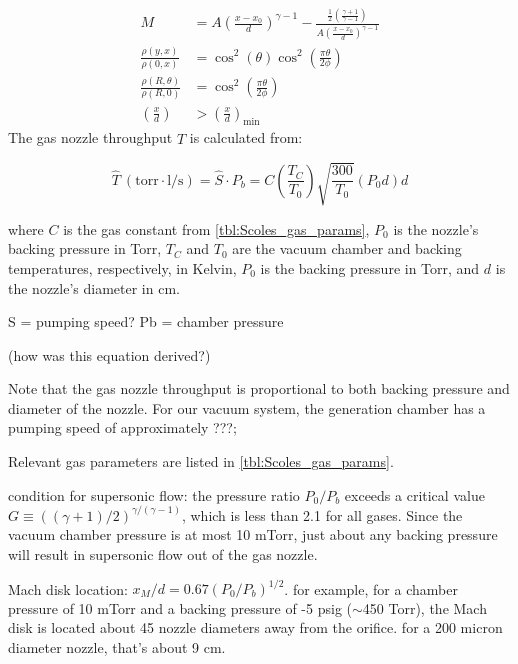 \begin{subequations}
	\label{eqn:Scoles_centerline2.1}
	\begin{align}
	M &= A \left( \frac{x-x_0}{d}\right)^{\gamma-1} - \frac{\frac{1}{2} \left( \frac{\gamma+1}{\gamma-1} \right)}{A \left(\frac{x-x_0}{d} \right)^{\gamma-1}} \label{eqn:gas_mach} \\
	\frac{\rho(y,x)}{\rho(0,x)} &= \cos^2(\theta) \cos^2\left(\frac{\pi\theta}{2\phi}\right) \\
	\frac{\rho(R,\theta)}{\rho(R,0)} &= \cos^2\left(\frac{\pi\theta}{2\phi}\right) \\
	\left(\frac{x}{d} \right) &> \left( \frac{x}{d} \right)_{\text{min}} \label{eqn:mach_cond}
	\end{align}
\end{subequations}
The gas nozzle throughput $\hat{T}$ is calculated from:


\begin{equation}
\hat{T} \ (\text{torr} \cdot \text{l}/\text{s}) = \hat{S} \cdot P_b = C \left(\frac{T_C}{T_0} \right)\sqrt{\frac{300}{T_0}}(P_0 d) d
\label{eqn:nozzle_thruput}
\end{equation}

where $C$ is the gas constant from \cref{tbl:Scoles_gas_params}, $P_0$ is the nozzle's backing pressure in Torr, $T_C$ and $T_0$ are the vacuum chamber and backing temperatures, respectively, in Kelvin, $P_0$ is the backing pressure in Torr, and $d$ is the nozzle's diameter in cm.

S = pumping speed?
Pb = chamber pressure

(how was this equation derived?)

Note that the gas nozzle throughput is proportional to both backing pressure and diameter of the nozzle. For our vacuum system, the generation chamber has a pumping speed of approximately ???; 

Relevant gas parameters are listed in \cref{tbl:Scoles_gas_params}.

condition for supersonic flow: the pressure ratio $P_0 / P_b$ exceeds a critical value $G \equiv ((\gamma+1)/2)^{\gamma/(\gamma-1)}$, which is less than 2.1 for all gases. Since the vacuum chamber pressure is at most 10 mTorr, just about any backing pressure will result in supersonic flow out of the gas nozzle.

Mach disk location: $x_M / d = 0.67(P_0/P_b)^{1/2}$. for example, for a chamber pressure of 10 mTorr and a backing pressure of -5 psig ($\sim$450 Torr), the Mach disk is located about 45 nozzle diameters away from the orifice. for a 200 micron diameter nozzle, that's about 9 cm.

